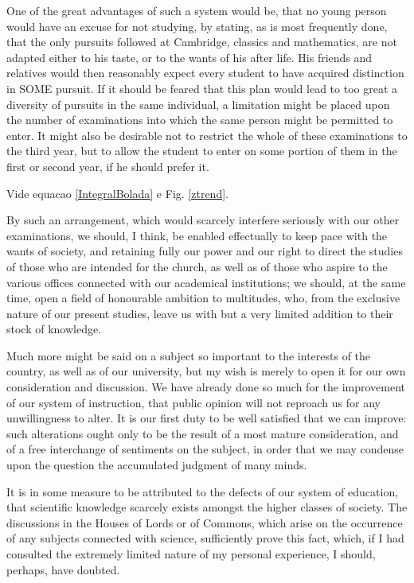 \documentclass{aa}
\begin{document}
One of the great advantages of such a system would be, that no young
person would have an excuse for not studying, by stating, as is most
frequently done, that the only pursuits followed at Cambridge, classics
and mathematics, are not adapted either to his taste, or to the wants of
his after life. His friends and relatives would then reasonably expect
every student to have acquired distinction in SOME pursuit. If it should
be feared that this plan would lead to too great a diversity of pursuits
in the same individual, a limitation might be placed upon the number of
examinations into which the same person might be permitted to enter. It
might also be desirable not to restrict the whole of these examinations
to the third year, but to allow the student to enter on some portion of
them in the first or second year, if he should prefer it.

Vide equacao \ref{IntegralBolada} e Fig. \ref{ztrend}.

By such an arrangement, which would scarcely interfere seriously with
our other examinations, we should, I think, be enabled effectually to
keep pace with the wants of society, and retaining fully our power
and our right to direct the studies of those who are intended for the
church, as well as of those who aspire to the various offices connected
with our academical institutions; we should, at the same time, open
a field of honourable ambition to multitudes, who, from the exclusive
nature of our present studies, leave us with but a very limited addition
to their stock of knowledge.

Much more might be said on a subject so important to the interests of
the country, as well as of our university, but my wish is merely to open
it for our own consideration and discussion. We have already done so
much for the improvement of our system of instruction, that public
opinion will not reproach us for any unwillingness to alter. It is our
first duty to be well satisfied that we can improve: such alterations
ought only to be the result of a most mature consideration, and of a
free interchange of sentiments on the subject, in order that we may
condense upon the question the accumulated judgment of many minds.

It is in some measure to be attributed to the defects of our system of
education, that scientific knowledge scarcely exists amongst the
higher classes of society. The discussions in the Houses of Lords or of
Commons, which arise on the occurrence of any subjects connected with
science, sufficiently prove this fact, which, if I had consulted the
extremely limited nature of my personal experience, I should, perhaps,
have doubted.
\end{document}
